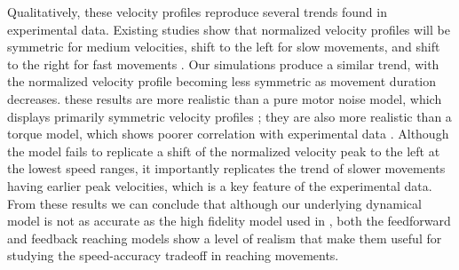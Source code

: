\documentclass[letterpaper, 10pt, conference]{ieeeconf}
\begin{document}
Qualitatively, these velocity profiles reproduce several trends found in experimental data.
Existing studies show that normalized velocity profiles will be symmetric for medium velocities, shift to the left for slow movements, and shift to the right for fast movements \cite{asymmetric_vel_acc}\cite{human_vel_curves}. 
Our simulations produce a similar trend, with the normalized velocity profile becoming less symmetric as movement duration decreases.
these results are more realistic than a pure motor noise model, which displays primarily symmetric velocity profiles \cite{signal_dependent_motor_noise}; they are also more realistic than a torque model, which shows poorer correlation with experimental data \cite{original_paper_high_fidelity}.
Although the model fails to replicate a shift of the normalized velocity peak to the left at the lowest speed ranges, it importantly replicates the trend of slower movements having earlier peak velocities, which is a key feature of the experimental data.
From these results we can conclude that although our underlying dynamical model is not as accurate as the high fidelity model used in \cite{original_paper_high_fidelity}, both the feedforward and feedback reaching models show a level of realism that make them useful for studying the speed-accuracy tradeoff in reaching movements.

\end{document}
